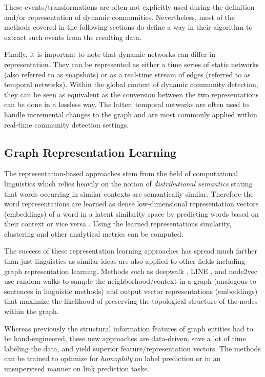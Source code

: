 \documentclass[
acmsmall,
nonacm,
screen,
acmthm]{../../scripts/pandoc/templates/acmart}
\begin{document}
These events/transformations are often not explicitly used during the
definition and/or representation of dynamic communities. Nevertheless,
most of the methods covered in the following sections do define a way in
their algorithm to extract such events from the resulting data.

Finally, it is important to note that dynamic networks can differ in
representation. They can be represented as either a time series of
static networks (also referred to as snapshots) or as a real-time stream
of edges (referred to as temporal networks). Within the global context
of dynamic community detection, they can be seen as equivalent as the
conversion between the two representations can be done in a lossless
way. The latter, temporal networks are often used to handle incremental
changes to the graph and are most commonly applied within real-time
community detection settings.

\hypertarget{graph-representation-learning}{%
\subsection{Graph Representation
Learning}\label{graph-representation-learning}}

The representation-based approaches stem from the field of computational
linguistics which relies heavily on the notion of \emph{distributional
semantics} stating that words occurring in similar contexts are
semantically similar. Therefore the word representations are learned as
dense low-dimensional representation vectors (embeddings) of a word in a
latent similarity space by predicting words based on their context or
vice versa
\citep{mikolovEfficientEstimationWord2013, penningtonGloveGlobalVectors2014}.
Using the learned representations similarity, clustering and other
analytical metrics can be computed.

The success of these representation learning approaches has spread much
farther than just linguistics as similar ideas are also applied to other
fields including graph representation learning. Methods such as deepwalk
\citep{perozziDeepWalkOnlineLearning2014}, LINE
\citep{tangLINELargescaleInformation2015}, and node2vec
\citep{groverNode2vecScalableFeature2016} use random walks to sample the
neighborhood/context in a graph (analogous to sentences in linguistic
methods) and output vector representations (embeddings) that maximize
the likelihood of preserving the topological structure of the nodes
within the graph.

Whereas previously the structural information features of graph entities
had to be hand-engineered, these new approaches are data-driven, save a
lot of time labeling the data, and yield superior feature/representation
vectors. The methods can be trained to optimize for \emph{homophily} on
label prediction or in an unsupervised manner on link prediction tasks.
\end{document}
